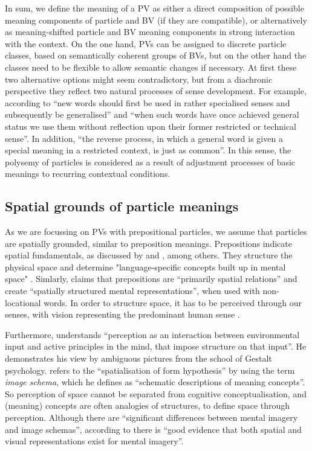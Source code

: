 \documentclass[output=paper]{langsci/langscibook}
\begin{document}
In sum, we define the meaning of a PV as either a direct composition
of possible meaning components of particle and BV (if they are
compatible), or alternatively as meaning-shifted particle and BV
meaning components in strong interaction with the context. On the one
hand, PVs can be assigned to discrete particle classes, based on
semantically coherent groups of BVs, but on the other hand the classes
need to be flexible to allow semantic changes if necessary. At first
these two alternative options might seem contradictory, but from a
diachronic perspective they reflect two natural processes of sense
development. For example, according to \cite{Waldron:79} ``new words
should first be used in rather specialised senses and subsequently be
generalised'' and ``when such words have once achieved general status
we use them without reflection upon their former restricted or
technical sense''. In addition, ``the reverse process, in which a
general word is given a special meaning in a restricted context, is
just as common''. In this sense, the polysemy of particles is
considered as a result of adjustment processes of basic meanings to
recurring contextual conditions.

\subsection{Spatial grounds of particle meanings}

As we are focussing on PVs with prepositional particles, we assume
that particles are spatially grounded, similar to preposition
meanings. Prepositions indicate spatial fundamentals, as discussed by
\cite{Herskovits:86} and \cite{Dirven:93}, among others. They
structure the physical space and determine "language-specific
concepts built up in mental space" \citep{Dirven:93}. Simlarly, \cite{Gaerdenfors:04}
claims that prepositions are ``primarily spatial relations'' and
create ``spatially structured mental representations'', when used with
non-locational words. In order to structure space, it has to be
perceived through our senses, with vision representing the predominant
human sense \citep{Viberg:83}.

Furthermore, \cite{Jackendoff:83} understands ``perception as an
interaction between environmental input and active principles in the
mind, that impose structure on that input''. He demonstrates his view
by ambiguous pictures from the school of Gestalt psychology.
\cite{Lakoff:87} refers to the ``spatialisation of form hypothesis''
by using the term \textit{image schema}, which he defines as
``schematic descriptions of meaning concepts''. So perception of space
cannot be separated from cognitive conceptualisation, and (meaning)
concepts are often analogies of structures, to define space through
perception. Although there are ``significant differences between
mental imagery and image schemas'', according to
\cite{Gibbs/Colston:95} there is ``good evidence that both spatial and
visual representations exist for mental imagery''.
\end{document}
